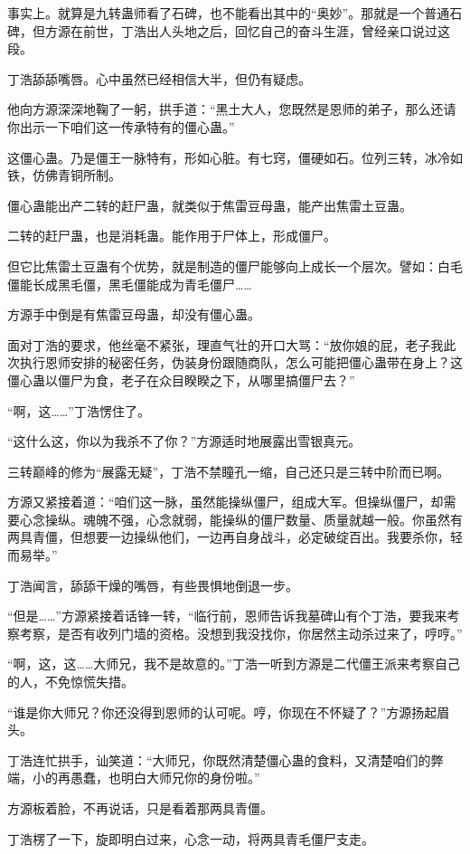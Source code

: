 \begin{this_body}
事实上。就算是九转蛊师看了石碑，也不能看出其中的“奥妙”。那就是一个普通石碑，但方源在前世，丁浩出人头地之后，回忆自己的奋斗生涯，曾经亲口说过这段。

丁浩舔舔嘴唇。心中虽然已经相信大半，但仍有疑虑。

他向方源深深地鞠了一躬，拱手道：“黑土大人，您既然是恩师的弟子，那么还请你出示一下咱们这一传承特有的僵心蛊。”

这僵心蛊。乃是僵王一脉特有，形如心脏。有七窍，僵硬如石。位列三转，冰冷如铁，仿佛青铜所制。

僵心蛊能出产二转的赶尸蛊，就类似于焦雷豆母蛊，能产出焦雷土豆蛊。

二转的赶尸蛊，也是消耗蛊。能作用于尸体上，形成僵尸。

但它比焦雷土豆蛊有个优势，就是制造的僵尸能够向上成长一个层次。譬如：白毛僵能长成黑毛僵，黑毛僵能成为青毛僵尸……

方源手中倒是有焦雷豆母蛊，却没有僵心蛊。

面对丁浩的要求，他丝毫不紧张，理直气壮的开口大骂：“放你娘的屁，老子我此次执行恩师安排的秘密任务，伪装身份跟随商队，怎么可能把僵心蛊带在身上？这僵心蛊以僵尸为食，老子在众目睽睽之下，从哪里搞僵尸去？”

“啊，这……”丁浩愣住了。

“这什么这，你以为我杀不了你？”方源适时地展露出雪银真元。

三转巅峰的修为“展露无疑”，丁浩不禁瞳孔一缩，自己还只是三转中阶而已啊。

方源又紧接着道：“咱们这一脉，虽然能操纵僵尸，组成大军。但操纵僵尸，却需要心念操纵。魂魄不强，心念就弱，能操纵的僵尸数量、质量就越一般。你虽然有两具青僵，但想要一边操纵他们，一边再自身战斗，必定破绽百出。我要杀你，轻而易举。”

丁浩闻言，舔舔干燥的嘴唇，有些畏惧地倒退一步。

“但是……”方源紧接着话锋一转，“临行前，恩师告诉我墓碑山有个丁浩，要我来考察考察，是否有收列门墙的资格。没想到我没找你，你居然主动杀过来了，哼哼。”

“啊，这，这……大师兄，我不是故意的。”丁浩一听到方源是二代僵王派来考察自己的人，不免惊慌失措。

“谁是你大师兄？你还没得到恩师的认可呢。哼，你现在不怀疑了？”方源扬起眉头。

丁浩连忙拱手，讪笑道：“大师兄，你既然清楚僵心蛊的食料，又清楚咱们的弊端，小的再愚蠢，也明白大师兄你的身份啦。”

方源板着脸，不再说话，只是看着那两具青僵。

丁浩楞了一下，旋即明白过来，心念一动，将两具青毛僵尸支走。


\end{this_body}
